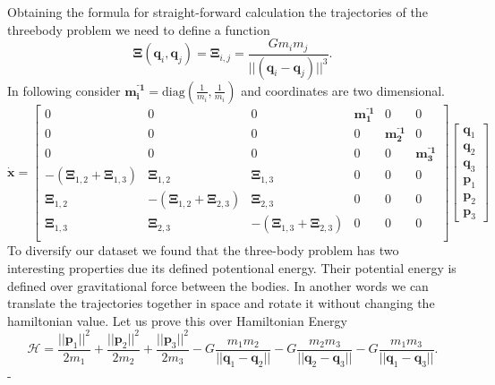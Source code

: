 Obtaining the formula for straight-forward calculation the trajectories of the threebody problem we need to define a function
\begin{equation}
	\boldsymbol{\Xi}(\mathbf{q}_i,\mathbf{q}_j)=\boldsymbol{\Xi}_{i,j}=\frac{Gm_im_j}{||(\mathbf{q}_i-\mathbf{q}_j)||^3}.
\end{equation}
In following consider $\mathbf{m_i^{⁻1}}=\text{diag}(\frac{1}{m_i},\frac{1}{m_i})$ and coordinates are two dimensional.
\begin{equation}
	\dot{\mathbf{x}} = 
	\begin{bmatrix}
		0 & 0 & 0 & \mathbf{m_1^{⁻1}} & 0 & 0\\
		0 & 0 & 0 & 0 & \mathbf{m_2^{⁻1}} & 0\\
		0 & 0 & 0 & 0 & 0 & \mathbf{m_3^{⁻1}}\\
		-(\boldsymbol{\Xi}_{1,2}+\boldsymbol{\Xi}_{1,3}) & \boldsymbol{\Xi}_{1,2} & \boldsymbol{\Xi}_{1,3} & 0 & 0 & 0\\
		\boldsymbol{\Xi}_{1,2} & -(\boldsymbol{\Xi}_{1,2}+\boldsymbol{\Xi}_{2,3}) & \boldsymbol{\Xi}_{2,3} & 0 & 0 & 0\\
		\boldsymbol{\Xi}_{1,3} & \boldsymbol{\Xi}_{2,3} & -(\boldsymbol{\Xi}_{1,3}+\boldsymbol{\Xi}_{2,3}) & 0 & 0 & 0\\
	\end{bmatrix}
	\begin{bmatrix}
		\mathbf{q}_1\\
		\mathbf{q}_2\\
		\mathbf{q}_3\\
		\mathbf{p}_1\\
		\mathbf{p}_2\\
		\mathbf{p}_3
	\end{bmatrix}
\end{equation}
To diversify our dataset we found that
the three-body problem has two interesting properties due its defined potentional energy. Their potential energy is defined over gravitational force between the bodies. In another words we can translate the trajectories together in space and rotate it without changing the hamiltonian value. Let us prove this over Hamiltonian Energy
\begin{equation}
	\mathcal{H} = \frac{||\mathbf{p}_1||^2}{2m_1} +\frac{||\mathbf{p}_2||^2}{2m_2}+\frac{||\mathbf{p}_3||^2}{2m_3} - G\frac{m_1m_2}{||\mathbf{q}_1 - \mathbf{q}_2||}-G\frac{m_2m_3}{||\mathbf{q}_2 - \mathbf{q}_3||}-G\frac{m_1m_3}{||\mathbf{q}_1 - \mathbf{q}_3||}. 
\end{equation}-
